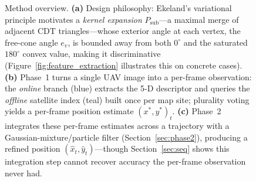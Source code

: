 \documentclass[10pt]{article}
\theoremstyle{plain}
\theoremstyle{definition}
\begin{document}
\begin{figure}[t]
{%
}
\caption{%
  Method overview.
  \textbf{(a)} Design philosophy: Ekeland's variational principle motivates a
  \emph{kernel expansion} $P_{\mathrm{sub}}$---a maximal merge of adjacent CDT
  triangles---whose exterior angle at each vertex, the free-cone angle $e_v$,
  is bounded away from both $0^\circ$ and the saturated $180^\circ$ convex
  value, making it discriminative (Figure~\ref{fig:feature_extraction}
  illustrates this on concrete cases).
  \textbf{(b)} Phase~1 turns a single UAV image into a per-frame observation:
  the \textit{online} branch (blue) extracts the 5-D descriptor and queries
  the \textit{offline} satellite index (teal) built once per map site;
  plurality voting yields a per-frame position estimate $(x^*,y^*)_t$.
  \textbf{(c)} Phase~2 integrates these per-frame estimates across a
  trajectory with a Gaussian-mixture/particle filter
  (Section~\ref{sec:phase2}), producing a refined position
  $(\hat x_t,\hat y_t)$---though Section~\ref{sec:seq} shows this integration
  step cannot recover accuracy the per-frame observation never had.%
}
\label{fig:pipeline}
\end{figure}
\end{document}
